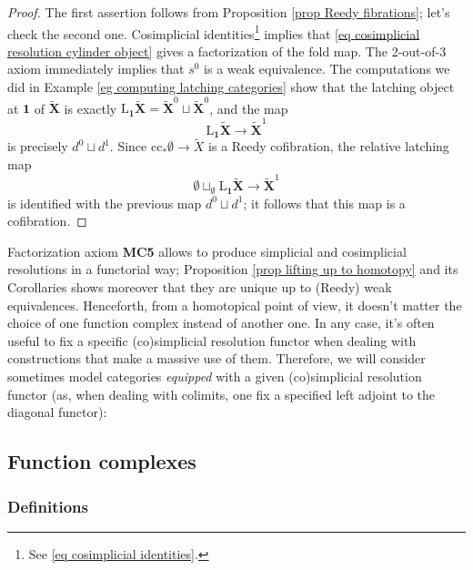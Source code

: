 \begin{proof}
The first assertion follows from Proposition \ref{prop Reedy fibrations}; let's check the second one. Cosimplicial identities\footnote{See \eqref{eq cosimplicial identities}.} implies that \eqref{eq cosimplicial resolution cylinder object} gives a factorization of the fold map. The 2-out-of-3 axiom immediately implies that $s^0$ is a weak equivalence. The computations we did in Example \ref{eg computing latching categories} show that the latching object at $\mathbf 1$ of $\widetilde{\mathbf X}$ is exactly $\mathrm L_{\mathbf 1} \widetilde{\mathbf X} = \widetilde{\mathbf X}^0 \sqcup \widetilde{\mathbf X}^0$, and the map
\[
\mathrm L_{\mathbf 1} \widetilde{\mathbf X} \to \widetilde{\mathbf X}^1
\]
is precisely $d^0 \sqcup d^1$. Since $\mathrm{cc}_* \emptyset \to \widetilde{X}$ is a Reedy cofibration, the relative latching map
\[
\emptyset \sqcup_{\emptyset} \mathrm L_{\mathbf 1} \widetilde{\mathbf X} \to \widetilde{\mathbf X}^1
\]
is identified with the previous map $d^0 \sqcup d^1$; it follows that this map is a cofibration.
\end{proof}

Factorization axiom {\bfseries MC5} allows to produce simplicial and cosimplicial resolutions in a functorial way; Proposition \ref{prop lifting up to homotopy} and its Corollaries shows moreover that they are unique up to (Reedy) weak equivalences. Henceforth, from a homotopical point of view, it doesn't matter the choice of one function complex instead of another one. In any case, it's often useful to fix a specific (co)simplicial resolution functor when dealing with constructions that make a massive use of them. Therefore, we will consider sometimes model categories \emph{equipped} with a given (co)simplicial resolution functor (as, when dealing with colimits, one fix a specified left adjoint to the diagonal functor): %

\subsection{Function complexes}

\subsubsection*{Definitions}

